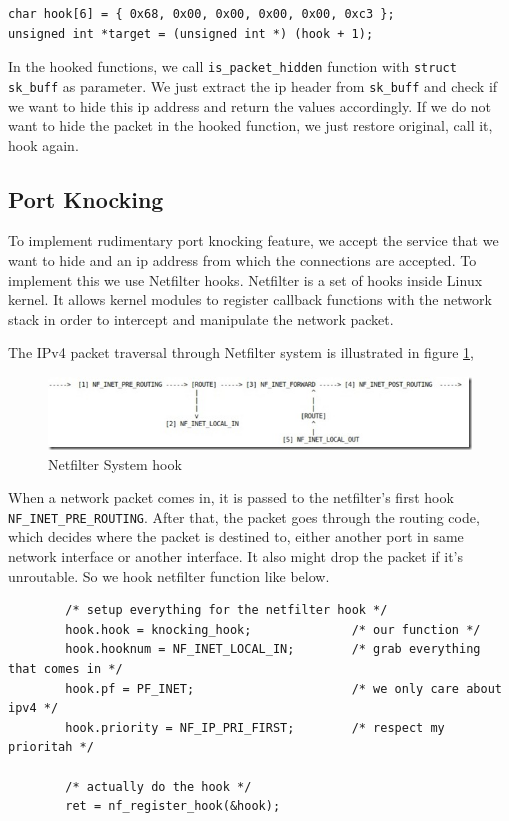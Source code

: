 \documentclass[10pt, letterpaper]{scrartcl}
\begin{document}
\begin{verbatim}
char hook[6] = { 0x68, 0x00, 0x00, 0x00, 0x00, 0xc3 };
unsigned int *target = (unsigned int *) (hook + 1);
\end{verbatim} 

In the hooked functions, we call \texttt{is\_packet\_hidden} function with \texttt{struct sk\_buff} as parameter.
We just extract the ip header from \texttt{sk\_buff} and check if we want to hide this ip address and return the values accordingly. 
If we do not want to hide the packet in the hooked function, we just restore original, call it, hook again. 
  
\subsection{Port Knocking}
To implement rudimentary port knocking feature, we accept the service that we want to hide and an ip address 
from which the connections are accepted. To implement this we use Netfilter hooks. Netfilter is a set of hooks inside Linux kernel. 
It allows kernel modules to register callback functions with the network stack in order to intercept and manipulate the network packet.

The IPv4 packet traversal through Netfilter system is illustrated in figure \ref{netfilter}, 
\begin{figure}
\centerline{
\includegraphics[width=1.0\columnwidth]{netfilter.jpg}
}
\caption{Netfilter System hook}
\label{netfilter}
\end{figure}

When a network packet comes in, it is passed to the netfilter’s first hook \texttt{NF\_INET\_PRE\_ROUTING}. After that, the packet goes through the routing code, which decides where the packet is destined to, either another port in same network interface or another interface. It also might drop the packet if it’s unroutable. So we hook netfilter function like below. 

\begin{verbatim}
        /* setup everything for the netfilter hook */
        hook.hook = knocking_hook;              /* our function */
        hook.hooknum = NF_INET_LOCAL_IN;        /* grab everything that comes in */
        hook.pf = PF_INET;                      /* we only care about ipv4 */
        hook.priority = NF_IP_PRI_FIRST;        /* respect my prioritah */

        /* actually do the hook */
        ret = nf_register_hook(&hook);
\end{verbatim} 
\end{document}
